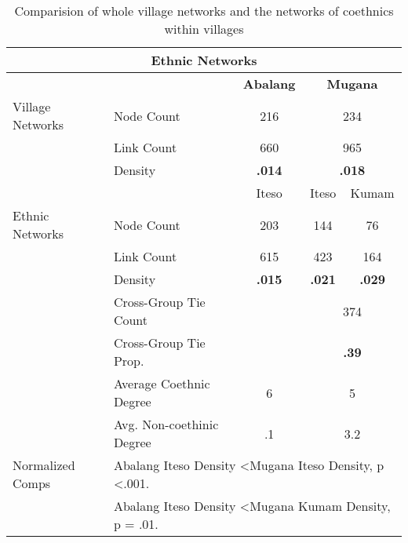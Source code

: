 \begin{table}[]
\centering
\caption{Comparision of whole village networks and the networks of coethnics within villages}
\begin{tabular}{llccc}
\hline
\multicolumn{5}{c}{\textbf{Ethnic Networks}}                                                                   \\ \hline
                 &                              & \textbf{Abalang}   & \multicolumn{2}{c}{\textbf{Mugana}}     \\ \hline
Village Networks & Node Count                   & 216                & \multicolumn{2}{c}{234}                 \\
                 & Link Count                   & 660                & \multicolumn{2}{c}{965}                 \\
                 & Density                      & \textbf{.014}      & \multicolumn{2}{c}{\textbf{.018}}       \\ \hline
                 &                              & Iteso              & Iteso              & Kumam              \\ \hline
Ethnic Networks  & Node Count                   & 203                & 144                & 76                 \\
                 & Link Count                   & 615                & 423                & 164                \\
                 & Density                      & \textbf{.015}      & \textbf{.021}      & \textbf{.029}      \\
                 & Cross-Group Tie Count        &                    & \multicolumn{2}{c}{374}                 \\
                 & Cross-Group Tie Prop.        &                    & \multicolumn{2}{c}{\textbf{.39}}        \\
                 & Average Coethnic Degree      & 6                  & \multicolumn{2}{c}{5}                   \\
                 & Avg. Non-coethinic Degree    & .1                 & \multicolumn{2}{c}{3.2}                 \\
Normalized Comps & \multicolumn{4}{l}{Abalang Iteso Density \textless Mugana Iteso Density, p \textless .001.} \\
                 & \multicolumn{4}{l}{Abalang Iteso Density \textless Mugana Kumam Density, p = .01.}          \\ \hline
\end{tabular}
\end{table}